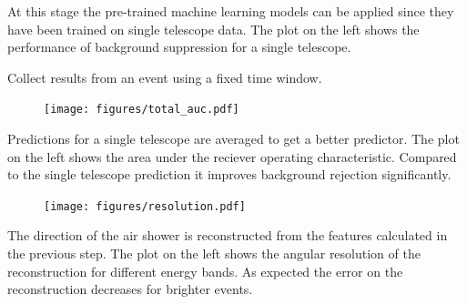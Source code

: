 \begin{multicols}{2}
\begin{center}
\begin{streamblock}[equal height group=C, width=0.8\linewidth]{-5mm}{-5mm}{}
\begin{multicols}{2}
            At this stage the pre-trained machine learning models can be applied since they
            have been trained on single telescope data. The plot on the left shows the performance
            of background suppression for a single telescope.

          \end{multicols}
        \end{streamblock}%


        \begin{streamblock}[height=2.1cm, colframe=white!60!black,, width=0.8\linewidth]{-5mm}{0}{}%
          \begin{center}
            Collect results from an event using a fixed time window.
          \end{center}
        \end{streamblock}%

        \begin{streamblock}[equal height group=C, width=0.8\linewidth]{0mm}{-5mm}{}%
          \begin{multicols}{2}
            \begin{figure}
              \texttt{[image: figures/total\_auc.pdf]}
            \end{figure}
            \columnbreak
            Predictions for a single telescope are averaged to get a better predictor.
            The plot on the left shows the area under the reciever operating characteristic.
            Compared to the single telescope prediction it improves background rejection significantly.
          \end{multicols}
        \end{streamblock}%

        \begin{streamblock}[equal height group=C, width=0.8\linewidth]{-5mm}{-5mm}{}%
          \begin{multicols}{2}
            \begin{figure}
              \texttt{[image: figures/resolution.pdf]}
            \end{figure}
            \columnbreak
            The direction of the air shower is reconstructed from the features calculated in the previous step.
            The plot on the left shows the angular resolution of the reconstruction for different energy bands.
            As expected the error on the reconstruction decreases for brighter events.
          \end{multicols}
        \end{streamblock}%


\end{center}
\end{multicols}
